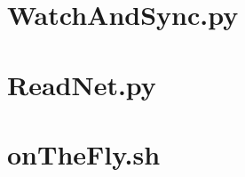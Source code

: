\documentclass[12pt]{article}
\begin{document}

\newpage

\appendix

\section{WatchAndSync.py}
\label{sec:WatchAndSync}


\section{ReadNet.py}
\label{sec:ReadNet}


\section{onTheFly.sh}
\label{sec:onTheFly}

\end{document}

